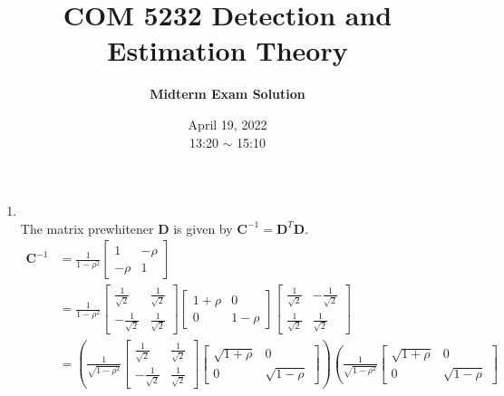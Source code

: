 \documentclass[a4paper,12pt]{article}
\title{\textbf{COM 5232 Detection and Estimation Theory}}
\author{\textbf{Midterm Exam Solution}}
\date{April 19, 2022\\
13:20 $\sim$ 15:10
}
\begin{document}
    \maketitle
    \begin{enumerate}
        \item\ \\
            The matrix prewhitener $\mathbf D$ is given by $\mathbf C^{-1}=\mathbf D^T\mathbf D$.
            \begin{align*}
                    \mathbf C^{-1}&=\frac{1}{1-\rho^2}\begin{bmatrix}
                    1 & -\rho\\
                    -\rho & 1 
                    \end{bmatrix}\\
                    &=\frac{1}{1-\rho^2}\begin{bmatrix}
                    \frac{1}{\sqrt{2}} & \frac{1}{\sqrt{2}}\\
                    -\frac{1}{\sqrt{2}} & \frac{1}{\sqrt{2}} 
                    \end{bmatrix}
                    \begin{bmatrix}
                    1+\rho & 0\\
                    0 & 1-\rho 
                    \end{bmatrix}
                    \begin{bmatrix}
                    \frac{1}{\sqrt{2}} & -\frac{1}{\sqrt{2}}\\
                    \frac{1}{\sqrt{2}} & \frac{1}{\sqrt{2}} 
                    \end{bmatrix}\\
                    &=\left(\frac{1}{\sqrt{1-\rho^2}}\begin{bmatrix}
                    \frac{1}{\sqrt{2}} & \frac{1}{\sqrt{2}}\\
                    -\frac{1}{\sqrt{2}} & \frac{1}{\sqrt{2}} 
                    \end{bmatrix}
                    \begin{bmatrix}
                    \sqrt{1+\rho} & 0\\
                    0 & \sqrt{1-\rho} 
                    \end{bmatrix}\right)
                    \left(\frac{1}{\sqrt{1-\rho^2}}\begin{bmatrix}
                    \sqrt{1+\rho} & 0\\
                    0 & \sqrt{1-\rho} 

\end{bmatrix}
\end{align*}
\end{enumerate}
\end{document}
